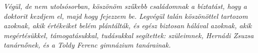 \documentclass[12pt,a4paper,oneside]{book}
\begin{document}
\noindent
\textit{Végül, de nem utolsósorban, köszönöm szűkebb családomnak a bíztatást, hogy a doktorit kezdjem el, majd hogy fejezzem be.
Legvégül talán köszönöttel tartozom azoknak, akik értékeiket belém plántálták, és egész biztosan hálával azoknak, akik megértésükkel, támogatásukkal, tudásukkal segítettek: szüleimnek, Hernádi Zsuzsa tanárnőnek, és a Toldy Ferenc gimnázium tanárainak.}


\end{document}
